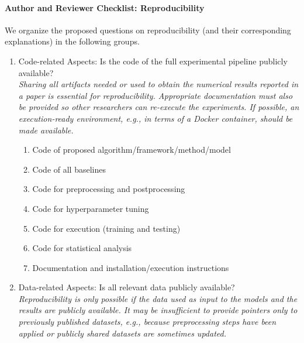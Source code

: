 %
%
%
\paragraph{Author and Reviewer Checklist: Reproducibility}
We organize the proposed questions on reproducibility (and their corresponding explanations) in the following groups.
\begin{enumerate}
\item Code-related Aspects: Is the code of the full experimental pipeline publicly available? \\ 
\emph{Sharing all artifacts needed or used to obtain the numerical results reported in a paper is essential for reproducibility. Appropriate documentation must also be provided so other researchers can re-execute the experiments. If possible, an execution-ready environment, e.g., in terms of a Docker container, should be made available.}
\begin{enumerate}[label*=\arabic*.]
    \item Code of proposed algorithm/framework/method/model
    \item Code of all baselines
    \item Code for preprocessing and postprocessing
    \item Code for hyperparameter tuning
    \item Code for execution (training and testing)
    \item Code for statistical analysis
    \item Documentation and installation/execution instructions
\end{enumerate}
\item Data-related Aspects: Is all relevant data publicly available? \\ 
\emph{Reproducibility is only possible if the data used as input to the models and the results are publicly available. It may be insufficient to provide pointers only to previously published datasets, e.g., because preprocessing steps have been applied or publicly shared datasets are sometimes updated.}
    \begin{enumerate}[label*=\arabic*.]

\end{enumerate}
\end{enumerate}
